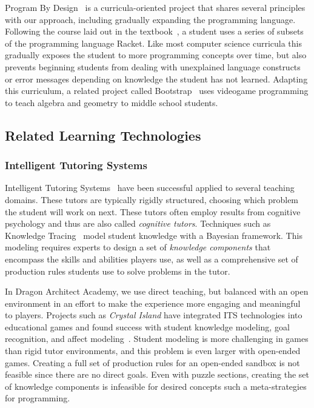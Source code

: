 \documentclass{sig-alternate}
\newcommand{\gametitle}{{\color{RoyalPurple} Dragon Architect Academy}}
\begin{document}
Program By Design~\cite{programbydesign} is a curricula-oriented project that shares several principles with our approach, including gradually expanding the programming language. 
Following the course laid out in the textbook~\cite{felleisen2001design}, a student uses a series of subsets of the programming language Racket.
Like most computer science curricula this gradually exposes the student to more programming concepts over time, but also prevents beginning students from dealing with unexplained language constructs or error messages depending on knowledge the student has not learned.
Adapting this curriculum, a related project called Bootstrap~\cite{bootstrap} uses videogame programming to teach algebra and geometry to middle school students.

\subsection{Related Learning Technologies}

\subsubsection{Intelligent Tutoring Systems}
Intelligent Tutoring Systems~\cite{koedinger06cognitive} have been successful applied to several teaching domains.
These tutors are typically rigidly structured, choosing which problem the student will work on next.
These tutors often employ results from cognitive psychology and thus are also called \emph{cognitive tutors}.
Techniques such as Knowledge Tracing~\cite{corbett1994knowledge} model student knowledge with a Bayesian framework.
This modeling requires experts to design a set of \emph{knowledge components} that encompass the skills and abilities players use, as well as a comprehensive set of production rules students use to solve problems in the tutor.

In \gametitle{}, we use direct teaching, but balanced with an open environment in an effort to make the experience more engaging and meaningful to players.
Projects such as \emph{Crystal Island} have integrated ITS technologies into educational games and found success with student knowledge modeling, goal recognition, and affect modeling~\cite{lester2013serious,rowe2010modeling}.
Student modeling is more challenging in games than rigid tutor environments, and this problem is even larger with open-ended games.
Creating a full set of production rules for an open-ended sandbox is not feasible since there are no direct goals.
Even with puzzle sections, creating the set of knowledge components is infeasible for desired concepts such a meta-strategies for programming.
\end{document}

